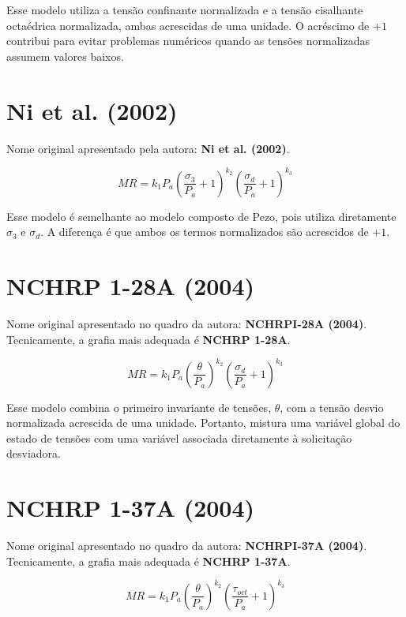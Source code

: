 \documentclass[12pt,a4paper]{article}
\begin{document}
Esse modelo utiliza a tensão confinante normalizada e a tensão cisalhante octaédrica normalizada, ambas acrescidas de uma unidade. O acréscimo de $+1$ contribui para evitar problemas numéricos quando as tensões normalizadas assumem valores baixos.

\section{Ni et al. (2002)}

Nome original apresentado pela autora: \textbf{Ni et al. (2002)}.

\begin{equation}
MR=k_1P_a
\left(\frac{\sigma_3}{P_a}+1\right)^{k_2}
\left(\frac{\sigma_d}{P_a}+1\right)^{k_3}
\end{equation}

Esse modelo é semelhante ao modelo composto de Pezo, pois utiliza diretamente $\sigma_3$ e $\sigma_d$. A diferença é que ambos os termos normalizados são acrescidos de $+1$.

\section{NCHRP 1-28A (2004)}

Nome original apresentado no quadro da autora: \textbf{NCHRPI-28A (2004)}. Tecnicamente, a grafia mais adequada é \textbf{NCHRP 1-28A}.

\begin{equation}
MR=k_1P_a
\left(\frac{\theta}{P_a}\right)^{k_2}
\left(\frac{\sigma_d}{P_a}+1\right)^{k_3}
\end{equation}

Esse modelo combina o primeiro invariante de tensões, $\theta$, com a tensão desvio normalizada acrescida de uma unidade. Portanto, mistura uma variável global do estado de tensões com uma variável associada diretamente à solicitação desviadora.

\section{NCHRP 1-37A (2004)}

Nome original apresentado no quadro da autora: \textbf{NCHRPI-37A (2004)}. Tecnicamente, a grafia mais adequada é \textbf{NCHRP 1-37A}.

\begin{equation}
MR=k_1P_a
\left(\frac{\theta}{P_a}\right)^{k_2}
\left(\frac{\tau_{oct}}{P_a}+1\right)^{k_3}
\end{equation}
\end{document}

